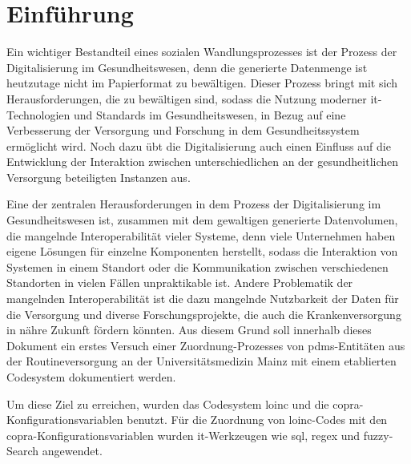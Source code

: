 \chapter{Einführung}

Ein wichtiger Bestandteil eines sozialen Wandlungsprozesses ist der Prozess der Digitalisierung im Gesundheitswesen, denn die generierte Datenmenge ist heutzutage nicht im Papierformat zu bewältigen. Dieser Prozess bringt mit sich Herausforderungen, die zu bewältigen sind, sodass die Nutzung moderner \ac{it}-Technologien und Standards im Gesundheitswesen, in Bezug auf eine Verbesserung der Versorgung und Forschung in dem Gesundheitssystem ermöglicht wird. Noch dazu übt die Digitalisierung auch einen Einfluss auf die Entwicklung der Interaktion zwischen unterschiedlichen an der gesundheitlichen Versorgung beteiligten Instanzen aus. 

Eine der zentralen Herausforderungen in dem Prozess der Digitalisierung im Gesundheitswesen ist, zusammen mit dem gewaltigen generierte Datenvolumen, die mangelnde Interoperabilität vieler Systeme, denn viele Unternehmen haben eigene Lösungen für einzelne Komponenten herstellt, sodass die Interaktion von Systemen in einem Standort oder die Kommunikation zwischen verschiedenen Standorten in vielen Fällen unpraktikable ist. Andere Problematik der mangelnden Interoperabilität ist die dazu mangelnde Nutzbarkeit der Daten für die Versorgung und diverse Forschungsprojekte, die auch die Krankenversorgung in nähre Zukunft fördern könnten. Aus diesem Grund soll innerhalb dieses Dokument ein erstes Versuch einer Zuordnung-Prozesses von \ac{pdms}-Entitäten aus der Routineversorgung an der Universitätsmedizin Mainz mit einem etablierten Codesystem dokumentiert werden.

Um diese Ziel zu erreichen, wurden das Codesystem \ac{loinc} und die \ac{copra}-Konfigurationsvariablen benutzt. Für die Zuordnung von \ac{loinc}-Codes mit den \ac{copra}-Konfigurationsvariablen wurden \ac{it}-Werkzeugen wie \ac{sql}, \ac{regex} und fuzzy-Search angewendet.


